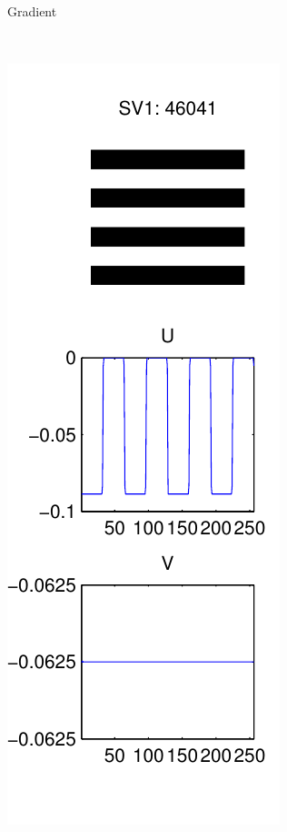 \documentclass{report}
\begin{document}
\begin{figure}[H]
\begin{subfigure}[b]{0.2\textwidth}
                \caption{Gradient}
        \end{subfigure}
        ~~~
        \begin{subfigure}[b]{0.2\textwidth}
                \includegraphics[width=\textwidth]{graphics/singular_vectors_horizontal.pdf}

\end{subfigure}
\end{figure}
\end{document}
